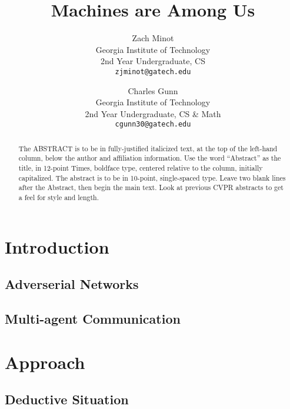 \documentclass[10pt,twocolumn,letterpaper]{article}
\begin{document}
\title{Machines are Among Us}

\author{Zach Minot\\
Georgia Institute of Technology\\
2nd Year Undergraduate, CS\\
{\tt\small zjminot@gatech.edu}
\and
Charles Gunn\\
Georgia Institute of Technology\\
2nd Year Undergraduate, CS \& Math\\
{\tt\small cgunn30@gatech.edu}
}

\maketitle

\begin{abstract}
   The ABSTRACT is to be in fully-justified italicized text, at the top
   of the left-hand column, below the author and affiliation
   information. Use the word ``Abstract'' as the title, in 12-point
   Times, boldface type, centered relative to the column, initially
   capitalized. The abstract is to be in 10-point, single-spaced type.
   Leave two blank lines after the Abstract, then begin the main text.
   Look at previous CVPR abstracts to get a feel for style and length.
\end{abstract}

\section{Introduction}
\subsection{Adverserial Networks}
\subsection{Multi-agent Communication}

\section{Approach}
\subsection{Deductive Situation}
\end{document}
